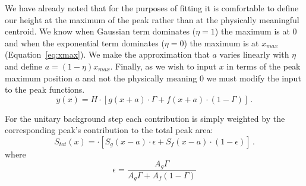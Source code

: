 \documentclass[a4paper,10pt]{article}
\begin{document}
We have already noted that for the purposes of fitting it is comfortable to define our height at the maximum of the peak rather than at the physically meaningful centroid. We know when Gaussian term dominates ($\eta=1$) the maximum is at 0 and when the exponential term dominates ($\eta=0$) the maximum is at $x_{max}$ (Equation~\ref{eq:xmax}). We make the approximation that $a$ varies linearly with $\eta$ and define $a=(1-\eta)x_{max}$. Finally, as we wish to input $x$ in terms of the peak maximum position $a$ and not the physically meaning 0 we must modify the input to the peak functions.
\begin{equation}
y(x) = H \cdot 
\left[
g(x+a)\cdot\Gamma
+
f(x+a)
\cdot(1-\Gamma)\right]\,.
\end{equation}


For the unitary background step each contribution is simply weighted by the corresponding peak's contribution to the total peak area:
\begin{equation}
S_{tot}(x) = \cdot 
\left[
S_g(x-a)\cdot\epsilon
+
S_f(x-a)
\cdot(1-\epsilon)\right]\,.
\end{equation}
where
\begin{equation}
\epsilon=\frac{A_g\Gamma}{A_g\Gamma + A_f(1-\Gamma)}
\end{equation}
\end{document}
